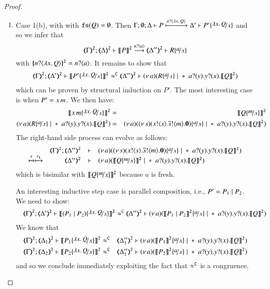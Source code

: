 \begin{proof}
\begin{enumerate}[1.]
	\item Case 1(b), with with $\mathtt{fs}(Q) =  \emptyset$. 
%
	Then
		$\Gamma; \es; \Delta \proves P \hby{\bactinp{n}{\abs{x}{Q}}} \Delta' \proves P' \subst{\abs{x}{Q}}{x}$
		and so we infer that
	\begin{equation*}
		\tmap{\Gamma}{2};  \tmap{\Delta}{2} \proves \pmap{P}{2} \by{\bactinp{n}{a}} \tmap{\Delta''}{2} \proves R \subst{a}{x}
	\end{equation*}
%
	\noi with $\{\!\!\{n ? \langle \lambda x.\,Q \rangle\}\!\!\}^{\mathtt{2}} = n ? \langle a \rangle$.
%
	It remains to show that
%
	\begin{eqnarray*}
		\tmap{\Gamma}{2};  \tmap{\Delta'}{2} \proves \pmap{P' \subst{\abs{x}{Q}}{x}}{2} \fwb
		\tmap{\Delta''}{2} \proves \newsp{a}{R \subst{a}{x} \Par \repl{\binp{a}{y} \binp{y}{x} \pmap{Q}{2}}}
	\end{eqnarray*}
which can be proven by structural induction on $P'$.
The most interesting case is when $P' = x\, {m}$. We then have:
%
	\begin{eqnarray*}
		\pmap{\appl{x}{m} \subst{\abs{x}{Q}}{x}}{2} &=& \pmap{Q \subst{m}{x}}{2}\\
		\newsp{a}{R \subst{a}{x} \Par \repl{\binp{a}{y} \binp{y}{x} \pmap{Q}{2}}} &=& \newsp{a}{\newsp{s}{ \bout{x}{s} \bout{\dual{s}}{m} \inact} \subst{a}{x} \Par \repl{\binp{a}{y} \binp{y}{x} \pmap{Q}{2}}}
	\end{eqnarray*}
%
	\noi The right-hand side process can evolve as follows:
%
	\begin{eqnarray*}
		\mhorel{\tmap{\Gamma}{2}}{\tmap{\Delta''}{2}}{\newsp{a}{\newsp{s}{ \bout{x}{s} \bout{\dual{s}}{m} \inact} \subst{a}{x} \Par \repl{\binp{a}{y} \binp{y}{x} \pmap{Q}{2}}}}
		{\hby{\tau} \hby{\stau}}
		{\tmap{\Delta''}{2}}{}{\newsp{a}{\pmap{Q \subst{m}{x}}{2} \Par \repl{\binp{a}{y} \binp{y}{x} \pmap{Q}{2}}}}
	\end{eqnarray*}
%
	\noi which is bisimilar with		$\pmap{Q \subst{m}{x}}{2}$ because $a$ is fresh.

	\noi An interesting inductive step case is parallel composition, i.e., $P' = P_1 \;|\; P_2$. We need to show:
%
	\begin{eqnarray*}
		&& \tmap{\Gamma}{2};   \tmap{\Delta'}{2} \proves \pmap{(P_1 \Par P_2) \subst{\abs{x}{Q}}{x}}{2} \fwb
		\tmap{\Delta''}{2} \proves \newsp{a}{\pmap{P_1 \Par P_2}{2} \subst{a}{x} \Par \repl{\binp{a}{y} \binp{y}{x} \pmap{Q}{2}}}
	\end{eqnarray*}
%
	\noi We know that
%
	\begin{eqnarray*}
		\horel{\tmap{\Gamma}{2}}{\tmap{\Delta_1}{2}}{\pmap{P_1\subst{\abs{x}{Q}}{x}}{2}}{&\fwb&}
		{\tmap{\Delta_1''}{2}}{\newsp{a}{\pmap{P_1}{2} \subst{a}{x} \Par \repl{\binp{a}{y} \binp{y}{x} \pmap{Q}{2}}}}\\
		\horel{\tmap{\Gamma}{2}}{\tmap{\Delta_2}{2}}{\pmap{P_2\subst{\abs{x}{Q}}{x}}{2}}{&\fwb&}
		{\tmap{\Delta_1''}{2}}{\newsp{a}{\pmap{P_2}{2} \subst{a}{x} \Par \repl{\binp{a}{y} \binp{y}{x} \pmap{Q}{2}}}}
	\end{eqnarray*}
%
	\noi and so we conclude immediately exploiting the fact that $\approx^\mathtt{C}$ is a congruence.


\end{enumerate}
\end{proof}
